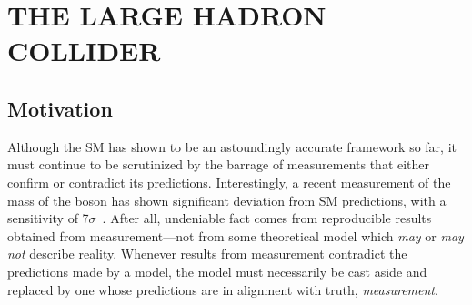 
\chapter{THE LARGE HADRON COLLIDER}
\label{ch:lhc}

\section{Motivation}
Although the SM
has shown to be an astoundingly accurate framework so far, it must continue to be scrutinized by the barrage of measurements that either confirm or contradict its predictions.
Interestingly, a recent measurement of the mass of the \PW boson has shown significant deviation from SM predictions, with a sensitivity of 7$\sigma$~\cite{cdf_collaboration_high-precision_2022}.
After all, undeniable fact comes from reproducible results obtained from measurement---not from some theoretical model which \emph{may} or \emph{may not} describe reality.
Whenever results from measurement contradict the predictions made by a model, the model must necessarily be cast aside and replaced by one whose predictions are in alignment with truth, \ie \emph{measurement}.


